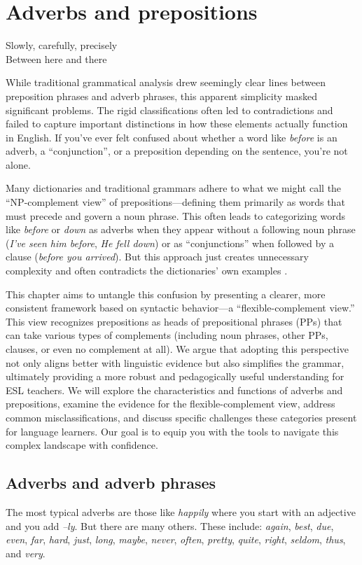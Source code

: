 \chapter{Adverbs and prepositions}

\epigraph{Slowly, carefully, precisely\\Between here and there}{}

\noindent
While traditional grammatical analysis drew seemingly clear lines between preposition phrases and adverb phrases, this apparent simplicity masked significant problems. The rigid classifications often led to contradictions and failed to capture important distinctions in how these elements actually function in English. If you've ever felt confused about whether a word like \textit{before} is an adverb, a ``conjunction'', or a preposition depending on the sentence, you're not alone.

Many dictionaries and traditional grammars adhere to what we might call the ``NP-complement view'' of prepositions---defining them primarily as words that must precede and govern a noun phrase. This often leads to categorizing words like \textit{before} or \textit{down} as adverbs when they appear without a following noun phrase (\textit{I've seen him before}, \textit{He fell down}) or as ``conjunctions'' when followed by a clause (\textit{before you arrived}). But this approach just creates unnecessary complexity and often contradicts the dictionaries' own examples \autocite{reynolds2025}.

This chapter aims to untangle this confusion by presenting a clearer, more consistent framework based on syntactic behavior---a ``flexible-complement view.'' This view recognizes prepositions as heads of prepositional phrases (PPs) that can take various types of complements (including noun phrases, other PPs, clauses, or even no complement at all). We argue that adopting this perspective not only aligns better with linguistic evidence but also simplifies the grammar, ultimately providing a more robust and pedagogically useful understanding for ESL teachers. We will explore the characteristics and functions of adverbs and prepositions, examine the evidence for the flexible-complement view, address common misclassifications, and discuss specific challenges these categories present for language learners. Our goal is to equip you with the tools to navigate this complex landscape with confidence.

\section{Adverbs and adverb phrases}
The most typical adverbs are those like \textit{happily} where you start with an adjective and you add \textit{--ly}. But there are many others. These include: \textit{again}, \textit{best}, \textit{due}, \textit{even}, \textit{far}, \textit{hard}, \textit{just}, \textit{long}, \textit{maybe}, \textit{never}, \textit{often}, \textit{pretty}, \textit{quite}, \textit{right}, \textit{seldom}, \textit{thus}, and \textit{very}.

